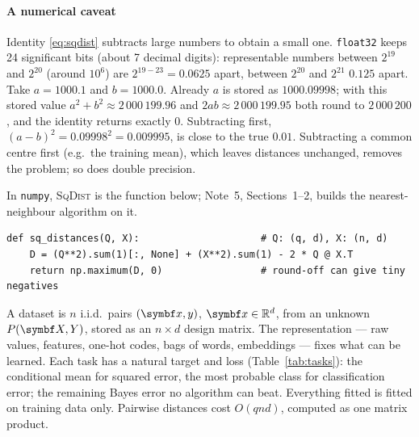\documentclass[11pt]{article}
\begin{document}
\paragraph{A numerical caveat} Identity \eqref{eq:sqdist} subtracts large numbers to obtain a small one.
\texttt{float32} keeps 24 significant bits (about 7 decimal digits): representable numbers between $2^{19}$ and
$2^{20}$ (around $10^6$) are $2^{19-23} = 0.0625$ apart, between $2^{20}$ and $2^{21}$ $0.125$ apart. Take $a = 1000.1$ and $b = 1000.0$. Already $a$ is stored as $1000.09998$; with this stored value $a^2 + b^2 \approx
2\,000\,199.96$ and $2ab \approx 2\,000\,199.95$ both round to $2\,000\,200$, and the identity returns exactly $0$.
Subtracting first, $(a - b)^2 = 0.09998^2 = 0.009995$, is close to the true $0.01$. Subtracting a common centre
first (e.g.\ the training mean), which leaves distances unchanged, removes the problem; so does double precision.

In \texttt{numpy}, \textsc{SqDist} is the function below; Note~5, Sections~1--2, builds the nearest-neighbour algorithm on it.
\begin{verbatim}
def sq_distances(Q, X):                     # Q: (q, d), X: (n, d)
    D = (Q**2).sum(1)[:, None] + (X**2).sum(1) - 2 * Q @ X.T
    return np.maximum(D, 0)                 # round-off can give tiny negatives
\end{verbatim}

\begin{keyidea}[Summary]
A dataset is $n$ i.i.d.\ pairs $(\x, y)$, $\x \in \R^d$, from an unknown $P(\X, Y)$, stored as an $n \times d$ design
matrix. The representation --- raw values, features, one-hot codes, bags of words, embeddings --- fixes what can be
learned. Each task has a natural target and loss (Table~\ref{tab:tasks}): the conditional mean for squared error,
the most probable class for classification error; the remaining Bayes error no algorithm can beat. Everything
fitted is fitted on training data only. Pairwise distances cost $O(qnd)$, computed as one matrix product.
\end{keyidea}
\end{document}
